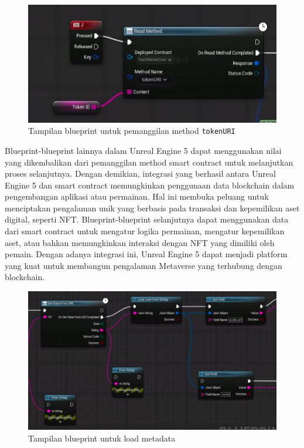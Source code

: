 \begin{figure}[H]
  \centering

  \includegraphics[scale=0.35]{gambar/blueprint-tokenuri.jpg}

  \caption{Tampilan blueprint untuk pemanggilan method \texttt{tokenURI}}
  \label{fig:blueprinttokenuri}
\end{figure}

Blueprint-blueprint lainnya dalam Unreal Engine 5 dapat menggunakan nilai yang dikembalikan
dari pemanggilan method smart contract untuk melanjutkan proses selanjutnya. Dengan demikian, integrasi yang
berhasil antara Unreal Engine 5 dan smart contract memungkinkan penggunaan data blockchain dalam
pengembangan aplikasi atau permainan. Hal ini membuka peluang untuk menciptakan pengalaman unik yang berbasis pada transaksi
dan kepemilikan aset digital, seperti NFT. Blueprint-blueprint selanjutnya dapat menggunakan data dari smart contract untuk mengatur logika permainan,
mengatur kepemilikan aset, atau bahkan memungkinkan interaksi dengan NFT yang dimiliki oleh pemain. Dengan adanya integrasi ini,
Unreal Engine 5 dapat menjadi platform yang kuat untuk membangun pengalaman Metaverse yang terhubung dengan blockchain.

\begin{figure}[H]
  \centering

  \includegraphics[scale=0.35]{gambar/blueprint-load-metadata.jpg}

  \caption{Tampilan blueprint untuk load metadata}
  \label{fig:blueprintloadmetadata}
\end{figure}

